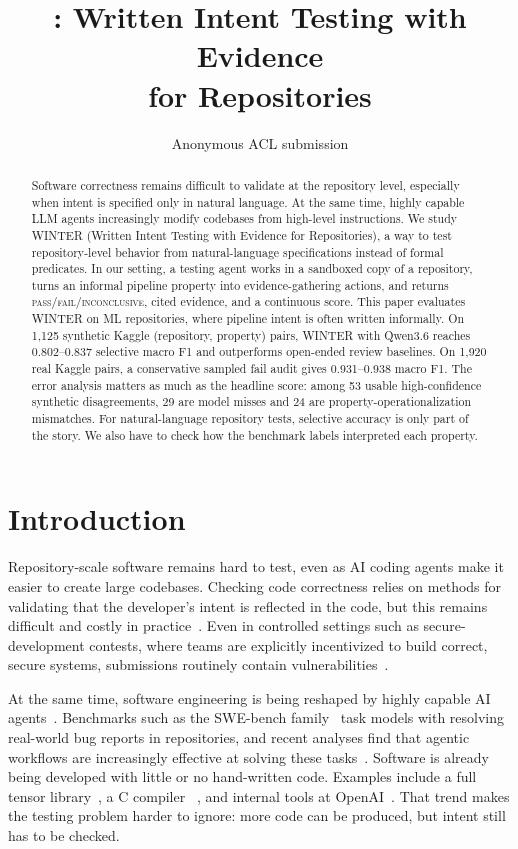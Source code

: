 \documentclass[11pt]{article}
\title{\vibetest: Written Intent Testing with Evidence\\for Repositories}
\author{Anonymous ACL submission}
\newcommand{\pass}{\textsc{pass}}
\newcommand{\fail}{\textsc{fail}}
\newcommand{\inconclusive}{\textsc{inconclusive}}
\newcommand{\vibetest}{\textsc{WINTER}}
\newcommand{\qwen}{Qwen3.6}
\begin{document}
\maketitle

\begin{abstract}
Software correctness remains difficult to validate at the repository level,
especially when intent is specified only in natural language.
At the same time, highly capable LLM agents increasingly modify codebases from
high-level instructions.
We study \vibetest{} (Written Intent Testing with Evidence for Repositories), a
way to test repository-level behavior from natural-language specifications
instead of formal predicates.
In our setting, a testing agent works in a sandboxed copy of a repository,
turns an informal pipeline property into evidence-gathering actions, and
returns \pass/\fail/\inconclusive{}, cited evidence, and a continuous score.
This paper evaluates \vibetest{} on ML repositories, where pipeline intent is
often written informally.
On 1,125 synthetic Kaggle (repository, property) pairs, \vibetest{} with
\qwen{} reaches 0.802--0.837 selective macro F1 and outperforms open-ended
review baselines.
On 1,920 real Kaggle pairs, a conservative sampled fail audit gives
0.931--0.938 macro F1.
The error analysis matters as much as the headline score: among 53 usable
high-confidence synthetic disagreements, 29 are model misses and 24 are
property-operationalization mismatches.
For natural-language repository tests, selective accuracy is only part of the
story. We also have to check how the benchmark labels interpreted each
property.
\end{abstract}

\section{Introduction}

Repository-scale software remains hard to test, even as AI coding agents make
it easier to create large codebases.
Checking code correctness relies on methods for validating that the developer's
intent is reflected in the code, but this remains difficult and costly in
practice~\citep{zeller2009why}.
Even in controlled settings such as secure-development contests, where teams
are explicitly incentivized to build correct, secure systems, submissions
routinely contain vulnerabilities~\citep{ruef2016bibifi}.

At the same time, software engineering is being reshaped by highly capable AI
agents~\citep{metr2025longtasks}.
Benchmarks such as the SWE-bench family~\citep{jimenez2024swebench,
swebench-verified} task models with resolving real-world bug reports in
repositories, and recent analyses find that agentic workflows are increasingly
effective at solving these tasks~\citep{xia2024agentless,guo2025repoaudit}.
Software is already being developed with little or no hand-written code.
Examples include a full tensor library~\citep{vibetensor}, a C compiler
~\citep{carlini2026building}, and internal tools at OpenAI~\citep{
lopopolo2026harness}.
That trend makes the testing problem harder to ignore: more code can be
produced, but intent still has to be checked.
\end{document}
